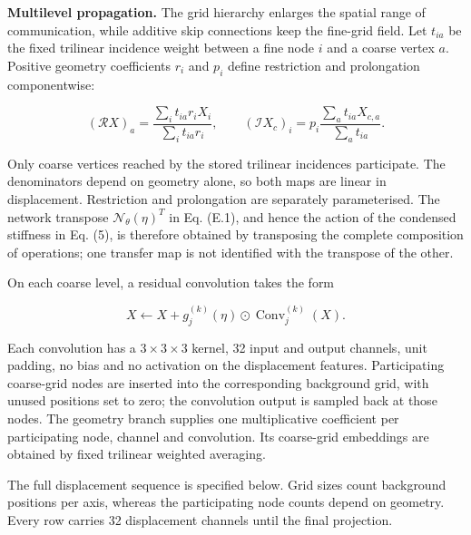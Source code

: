 \documentclass[preprint,12pt,authoryear]{elsarticle}
\begin{document}
\textbf{Multilevel propagation.} The grid hierarchy enlarges the spatial range of communication, while additive skip connections keep the fine-grid field. Let \(t_{ia}\) be the fixed trilinear incidence weight between a fine node \(i\) and a coarse vertex \(a\). Positive geometry coefficients \(r_i\) and \(p_i\) define restriction and prolongation componentwise:

\[
(\mathcal R X)_a=\frac{\sum_i t_{ia}r_iX_i}{\sum_i t_{ia}r_i},
\qquad
(\mathcal I X_c)_i=p_i\frac{\sum_a t_{ia}X_{c,a}}{\sum_a t_{ia}}.
\]

Only coarse vertices reached by the stored trilinear incidences participate. The denominators depend on geometry alone, so both maps are linear in displacement. Restriction and prolongation are separately parameterised. The network transpose \(\mathcal N_\theta(\eta)^T\) in Eq. (E.1), and hence the action of the condensed stiffness in Eq. (5), is therefore obtained by transposing the complete composition of operations; one transfer map is not identified with the transpose of the other.

On each coarse level, a residual convolution takes the form

\[
X\leftarrow X+g^{(k)}_j(\eta)\odot\operatorname{Conv}^{(k)}_j(X).
\]

Each convolution has a \(3\times3\times3\) kernel, 32 input and output channels, unit padding, no bias and no activation on the displacement features. Participating coarse-grid nodes are inserted into the corresponding background grid, with unused positions set to zero; the convolution output is sampled back at those nodes. The geometry branch supplies one multiplicative coefficient per participating node, channel and convolution. Its coarse-grid embeddings are obtained by fixed trilinear weighted averaging.

The full displacement sequence is specified below. Grid sizes count background positions per axis, whereas the participating node counts depend on geometry. Every row carries 32 displacement channels until the final projection.
\end{document}
